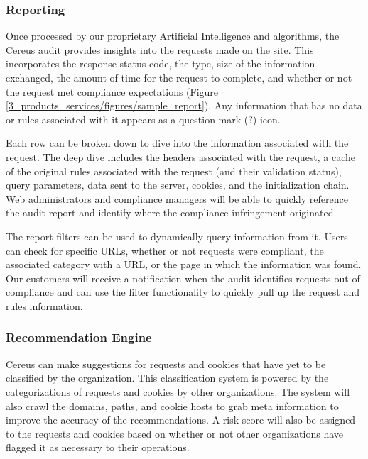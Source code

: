 \subsubsection{Reporting}

Once processed by our proprietary Artificial Intelligence and algorithms, the Cereus audit provides insights into the requests made on the site. This incorporates the response status code, the type, size of the information exchanged, the amount of time for the request to complete, and whether or not the request met compliance expectations (Figure \ref{3_products_services/figures/sample_report}). Any information that has no data or rules associated with it appears as a question mark (?) icon.

Each row can be broken down to dive into the information associated with the request. The deep dive includes the headers associated with the request, a cache of the original rules associated with the request (and their validation status), query parameters, data sent to the server, cookies, and the initialization chain. Web administrators and compliance managers will be able to quickly reference the audit report and identify where the compliance infringement originated.


The report filters can be used to dynamically query information from it. Users can check for specific URLs, whether or not requests were compliant, the associated category with a URL, or the page in which the information was found. Our customers will receive a notification when the audit identifies requests out of compliance and can use the filter functionality to quickly pull up the request and rules information. 

\subsubsection{Recommendation Engine}

Cereus can make suggestions for requests and cookies that have yet to be classified by the organization. This classification system is powered by the categorizations of requests and cookies by other organizations. The system will also crawl the domains, paths, and cookie hosts to grab meta information to improve the accuracy of the recommendations. A risk score will also be assigned to the requests and cookies based on whether or not other organizations have flagged it as necessary to their operations.


